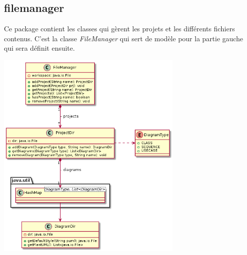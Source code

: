\documentclass[a4paper,10pt]{article}
\begin{document}
   \subsection{filemanager}
   Ce package contient les classes qui gèrent les projets et les différents fichiers contenus. 
   C'est la classe \emph{FileManager} qui sert de modèle pour la partie gauche qui sera définit ensuite.
    \begin{center}
	\includegraphics[width=9cm]{Image/partieGaucheModele.png}
    \end{center}
    
      
   \newpage
\end{document}
